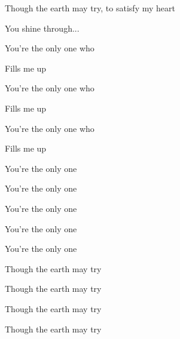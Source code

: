 \documentclass[9pt]{extarticle}
\begin{document}
\bsong

\bv
Though the earth may try, to satisfy my heart



You shine through...
\ev

\bc
You're the only one who

Fills me up

You're the only one who

Fills me up

You're the only one who

Fills me up

You're the only one
\ec



\bc
You're the only one

You're the only one

You're the only one

You're the only one
\ec


\bv
Though the earth may try

Though the earth may try

Though the earth may try

Though the earth may try
\ev


\esong
\end{document}

